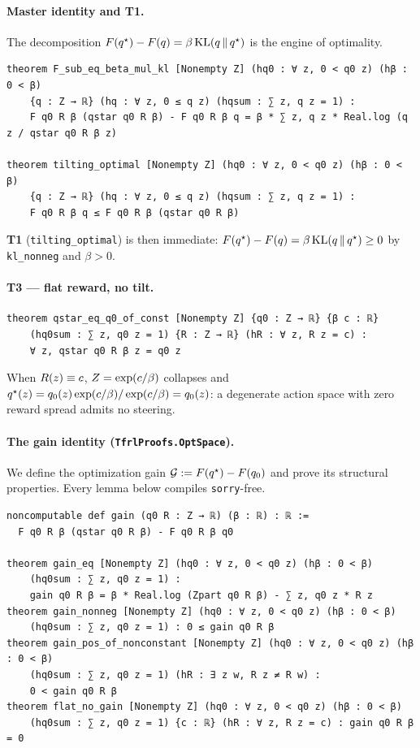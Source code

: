 \paragraph{Master identity and T1.}
The decomposition $F\!\left(q^{\star}\right)-F\!\left(q\right)=\beta\,\mathrm{KL}\!\left(q \,\|\, q^{\star}\right)$ is the engine of optimality.

\begin{verbatim}
theorem F_sub_eq_beta_mul_kl [Nonempty Z] (hq0 : ∀ z, 0 < q0 z) (hβ : 0 < β)
    {q : Z → ℝ} (hq : ∀ z, 0 ≤ q z) (hqsum : ∑ z, q z = 1) :
    F q0 R β (qstar q0 R β) - F q0 R β q = β * ∑ z, q z * Real.log (q z / qstar q0 R β z)

theorem tilting_optimal [Nonempty Z] (hq0 : ∀ z, 0 < q0 z) (hβ : 0 < β)
    {q : Z → ℝ} (hq : ∀ z, 0 ≤ q z) (hqsum : ∑ z, q z = 1) :
    F q0 R β q ≤ F q0 R β (qstar q0 R β)
\end{verbatim}

\noindent
\textbf{T1} (\texttt{tilting\_optimal}) is then immediate: $F\!\left(q^{\star}\right)-F\!\left(q\right)=\beta\,\mathrm{KL}\!\left(q \,\|\, q^{\star}\right)\ge 0$
by \texttt{kl\_nonneg} and $\beta>0$.

\paragraph{T3 --- flat reward, no tilt.}
\begin{verbatim}
theorem qstar_eq_q0_of_const [Nonempty Z] {q0 : Z → ℝ} {β c : ℝ}
    (hq0sum : ∑ z, q0 z = 1) {R : Z → ℝ} (hR : ∀ z, R z = c) :
    ∀ z, qstar q0 R β z = q0 z
\end{verbatim}
\noindent
When $R(z)\equiv c$, $Z=\exp(c/\beta)$ collapses and
$q^{\star}(z)=q_{0}(z)\exp(c/\beta)/\exp(c/\beta)=q_{0}(z)$: a degenerate action space with zero reward spread
admits no steering.

\paragraph{The gain identity (\texttt{TfrlProofs.OptSpace}).}
We define the optimization gain $\mathcal{G}:=F\!\left(q^{\star}\right)-F\!\left(q_{0}\right)$ and prove its structural properties.
Every lemma below compiles \texttt{sorry}-free.

\begin{verbatim}
noncomputable def gain (q0 R : Z → ℝ) (β : ℝ) : ℝ :=
  F q0 R β (qstar q0 R β) - F q0 R β q0

theorem gain_eq [Nonempty Z] (hq0 : ∀ z, 0 < q0 z) (hβ : 0 < β)
    (hq0sum : ∑ z, q0 z = 1) :
    gain q0 R β = β * Real.log (Zpart q0 R β) - ∑ z, q0 z * R z
theorem gain_nonneg [Nonempty Z] (hq0 : ∀ z, 0 < q0 z) (hβ : 0 < β)
    (hq0sum : ∑ z, q0 z = 1) : 0 ≤ gain q0 R β
theorem gain_pos_of_nonconstant [Nonempty Z] (hq0 : ∀ z, 0 < q0 z) (hβ : 0 < β)
    (hq0sum : ∑ z, q0 z = 1) (hR : ∃ z w, R z ≠ R w) :
    0 < gain q0 R β
theorem flat_no_gain [Nonempty Z] (hq0 : ∀ z, 0 < q0 z) (hβ : 0 < β)
    (hq0sum : ∑ z, q0 z = 1) {c : ℝ} (hR : ∀ z, R z = c) : gain q0 R β = 0
\end{verbatim}

